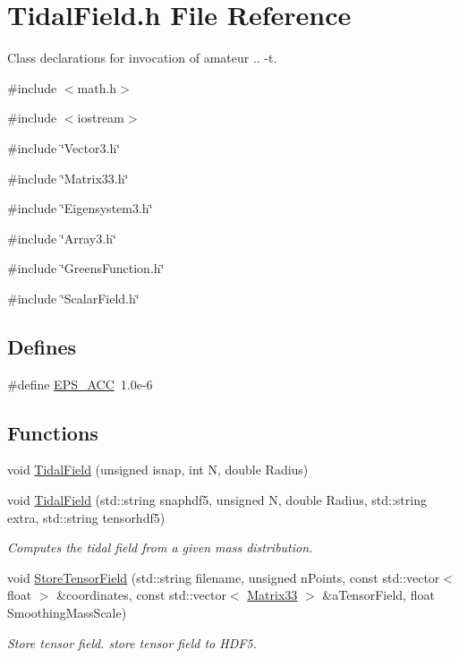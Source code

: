 \section{TidalField.h File Reference}
\label{TidalField_8h}


Class declarations for invocation of amateur .. -\/t.  


{\ttfamily \#include $<$math.h$>$}\par
{\ttfamily \#include $<$iostream$>$}\par
{\ttfamily \#include \char`\"{}Vector3.h\char`\"{}}\par
{\ttfamily \#include \char`\"{}Matrix33.h\char`\"{}}\par
{\ttfamily \#include \char`\"{}Eigensystem3.h\char`\"{}}\par
{\ttfamily \#include \char`\"{}Array3.h\char`\"{}}\par
{\ttfamily \#include \char`\"{}GreensFunction.h\char`\"{}}\par
{\ttfamily \#include \char`\"{}ScalarField.h\char`\"{}}\par
\subsection*{Defines}
\begin{DoxyCompactItemize}
\item 
\#define \hyperlink{TidalField_8h_a78d04e3c97de8dbf9d3250a633814e99}{EPS\_\-ACC}~1.0e-\/6
\end{DoxyCompactItemize}
\subsection*{Functions}
\begin{DoxyCompactItemize}
\item 
void \hyperlink{TidalField_8h_ad67677b74fe6123a6f5403a9610aba03}{TidalField} (unsigned isnap, int N, double Radius)
\item 
void \hyperlink{TidalField_8h_abb7805a812bc26fb645ef7cc1790a8d0}{TidalField} (std::string snaphdf5, unsigned N, double Radius, std::string extra, std::string tensorhdf5)
\begin{DoxyCompactList}\small\item\em Computes the tidal field from a given mass distribution. \item\end{DoxyCompactList}\item 
void \hyperlink{TidalField_8h_a4148c344aade56863506eafe83d9161e}{StoreTensorField} (std::string filename, unsigned nPoints, const std::vector$<$ float $>$ \&coordinates, const std::vector$<$ \hyperlink{classMatrix33}{Matrix33} $>$ \&aTensorField, float SmoothingMassScale)
\begin{DoxyCompactList}\small\item\em Store tensor field. store tensor field to HDF5. \item\end{DoxyCompactList}\end{DoxyCompactItemize}


